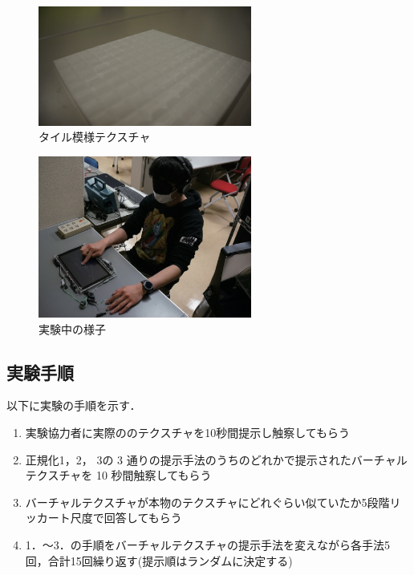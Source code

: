 \documentclass[a4paper]{jarticle}
\begin{document}
\begin{figure}[tb]
  \begin{center}
    \includegraphics*[width=70mm]{tile.eps}
  \end{center}
  \vspace*{-6mm}
  \caption{タイル模様テクスチャ}
  \label{fig5}
\end{figure}


\begin{figure}[tb]
  \begin{center}
    \includegraphics*[width=70mm]{exp.eps}
  \end{center}
  \vspace*{-6mm}
  \caption{実験中の様子}
  \label{fig3}
\end{figure}

\subsection{実験手順}%
以下に実験の手順を示す．
\begin{enumerate}
 \item 実験協力者に実際ののテクスチャを10秒間提示し触察してもらう
 \item 正規化1，2， 3の 3 通りの提示手法のうちのどれかで提示されたバーチャルテクスチャを 10 秒間触察してもらう
 \item バーチャルテクスチャが本物のテクスチャにどれぐらい似ていたか5段階リッカート尺度で回答してもらう
 \item 1．～3．の手順をバーチャルテクスチャの提示手法を変えながら各手法5回，合計15回繰り返す(提示順はランダムに決定する)
\end{enumerate}
\end{document}
